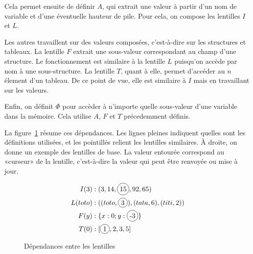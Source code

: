 Cela permet ensuite de définir $A$, qui extrait une valeur à partir d'un nom de
variable et d'une éventuelle hauteur de pile. Pour cela, on compose les
lentilles $I$ et $L$.

Les autres travaillent sur des valeurs composées, c'est-à-dire sur les
structures et tableaux. La lentille $F$ extrait une sous-valeur
correspondant au champ d'une structure. Le fonctionnement est similaire à la
lentille $L$ puisqu'on accède par nom à une sous-structure.
La lentille $T$, quant à elle, permet d'accéder au $n$\ieme élement d'un
tableau. De ce point de vue, elle est similaire à $I$ mais en travaillant sur
les valeurs.

Enfin, on définit $Φ$ pour accèder à n'importe quelle sous-valeur d'une variable
dans la mémoire. Cela utilise $A$, $F$ et $T$ précedemment définis.

La figure~\ref{fig:dep-lens} résume ces dépendances.
 Les lignes pleines indiquent quelles sont les
définitions utilisées, et les pointillés relient les lentilles similaires. À
droite, on donne un exemple des lentilles de base. La valeur entourée correspond
au «curseur» de la lentille, c'est-à-dire la valeur qui peut être renvoyée ou
mise à jour.

\begin{figure}[h]
\centering
\vspace{5mm}
\begin{minipage}[b]{0.4\textwidth}
\end{minipage}
\begin{minipage}[b]{0.5\textwidth}
\begin{align*}
I(3)     &: (3, 14, \circled{15}, 92, 65) \\
L(toto)  &: ((toto, \circled{3}), (tata, 6), (titi, 2)) \\
F(y)     &: \{ x: 0; y: \circled{-3} \} \\
T(0)     &: \eArray{\circled{1}, 2, 3, 5} \\
\end{align*}
\end{minipage}
\vspace{5mm}

\caption{Dépendances entre les lentilles}
\label{fig:dep-lens}

\end{figure}

